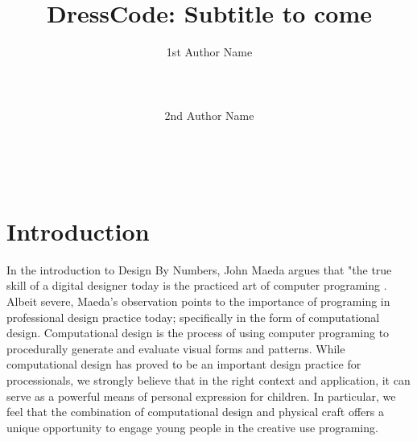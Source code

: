 \documentclass{sigchi}
\begin{document}
\title{DressCode: Subtitle to come}

\author{
 \alignauthor 1st Author Name\\
 \\
 \\
 \\
 \alignauthor 2nd Author Name\\
 \\
 \\
 \\
}

\maketitle

\begin{abstract}
\end{abstract}



\section{Introduction} %

In the introduction to Design By Numbers, John Maeda argues that "the true skill of a digital designer today is the practiced art of computer programing \cite{maeda}. Albeit severe, Maeda's observation points to the importance of programing in professional design practice today; specifically in the form of computational design. Computational design is the process of using computer programing to procedurally generate and evaluate visual forms and patterns. While computational design has proved to be an important design practice for processionals, we strongly believe that in the right context and application, it can serve as a powerful means of personal expression for children. In particular, we feel that the combination of computational design and physical craft offers a unique opportunity to engage young people in the creative use programing.
\end{document}
